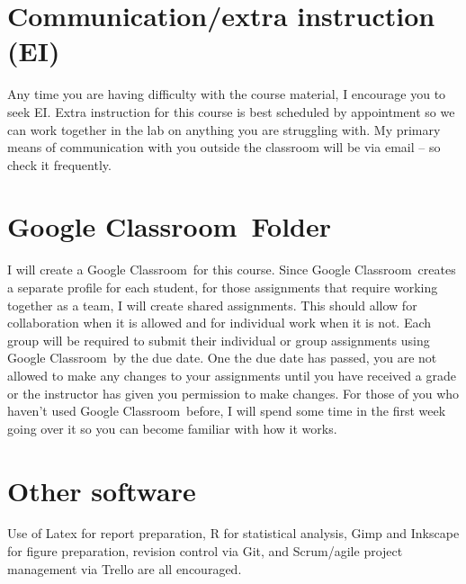 \documentclass[11pt,courier]{navymemo}
\newcommand{\GoogleClassroom}{Google Classroom}
\begin{document}
\section{Communication/extra instruction (EI)} Any time you are having difficulty with the course material, I encourage you to seek EI. Extra instruction for this course is best scheduled by appointment so we can work together in the lab on anything you are struggling with. My primary means of communication with you outside the classroom will be via email -- so check it frequently.

\section{\GoogleClassroom\ Folder}
I will create a \GoogleClassroom\ for this course.  Since \GoogleClassroom\ creates a separate profile for each student, for those assignments that require working together as a team, I will create shared assignments.  This should allow for collaboration when it is allowed and for individual work when it is not.   Each group will be required to submit their individual or group assignments using \GoogleClassroom\ by the due date.  One the due date has passed, you are not allowed to make any changes to your assignments until you have received a grade or the instructor has given you permission to make changes.  For those of you who haven’t used \GoogleClassroom\ before, I will spend some time in the first week going over it so you can become familiar with how it works.

\section{Other software} Use of Latex for report preparation, R for statistical analysis, Gimp and Inkscape for figure preparation, revision control via Git, and Scrum/agile project management via Trello are all encouraged. 

\clearpage
\end{document}
